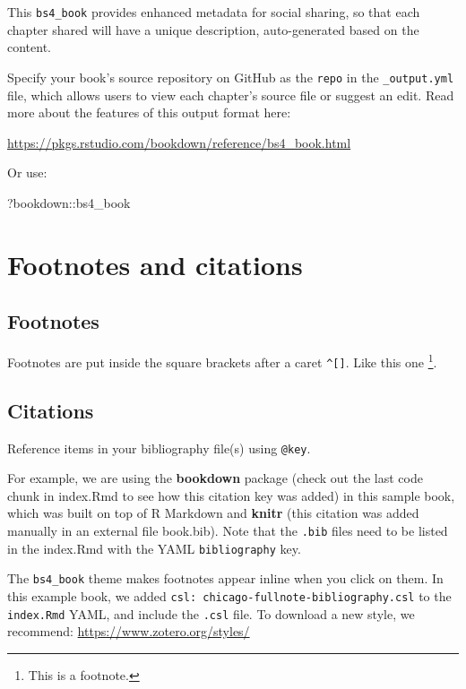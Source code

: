 \documentclass[
  oneside]{book}
\newenvironment{Shaded}{\begin{snugshade}}{\end{snugshade}}
\newcommand{\NormalTok}[1]{#1}
\newcommand{\SpecialCharTok}[1]{\textcolor[rgb]{0.00,0.00,0.00}{#1}}
\theoremstyle{definition}
\theoremstyle{definition}
\theoremstyle{definition}
\theoremstyle{definition}
\theoremstyle{remark}
\begin{document}
This \texttt{bs4\_book} provides enhanced metadata for social sharing, so that each chapter shared will have a unique description, auto-generated based on the content.

Specify your book's source repository on GitHub as the \texttt{repo} in the \texttt{\_output.yml} file, which allows users to view each chapter's source file or suggest an edit. Read more about the features of this output format here:

\url{https://pkgs.rstudio.com/bookdown/reference/bs4_book.html}

Or use:

\begin{Shaded}
\begin{Highlighting}[]
\NormalTok{?bookdown}\SpecialCharTok{::}\NormalTok{bs4\_book}
\end{Highlighting}
\end{Shaded}

\hypertarget{footnotes-and-citations}{%
\chapter{Footnotes and citations}\label{footnotes-and-citations}}

\hypertarget{footnotes}{%
\section{Footnotes}\label{footnotes}}

Footnotes are put inside the square brackets after a caret \texttt{\^{}{[}{]}}. Like this one \footnote{This is a footnote.}.

\hypertarget{citations}{%
\section{Citations}\label{citations}}

Reference items in your bibliography file(s) using \texttt{@key}.

For example, we are using the \textbf{bookdown} package \citep{R-bookdown} (check out the last code chunk in index.Rmd to see how this citation key was added) in this sample book, which was built on top of R Markdown and \textbf{knitr} \citep{xie2015} (this citation was added manually in an external file book.bib). Note that the \texttt{.bib} files need to be listed in the index.Rmd with the YAML \texttt{bibliography} key.

The \texttt{bs4\_book} theme makes footnotes appear inline when you click on them. In this example book, we added \texttt{csl:\ chicago-fullnote-bibliography.csl} to the \texttt{index.Rmd} YAML, and include the \texttt{.csl} file. To download a new style, we recommend: \url{https://www.zotero.org/styles/}
\end{document}
